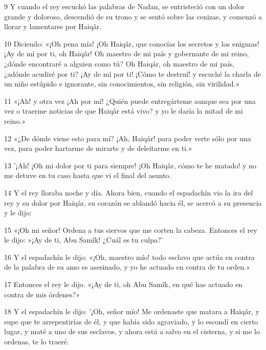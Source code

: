 \par 9 Y cuando el rey escuchó las palabras de Nadan, se entristeció con un dolor grande y doloroso, descendió de su trono y se sentó sobre las cenizas, y comenzó a llorar y lamentarse por Haiqâr.

\par 10 Diciendo: «¡Oh pena mía! ¡Oh Haiqâr, que conocías los secretos y los enigmas! ¡Ay de mí por ti, oh Haiqâr! Oh maestro de mi país y gobernante de mi reino, ¿dónde encontraré a alguien como tú? Oh Haiqâr, oh maestro de mi país, ¿adónde acudiré por ti? ¡Ay de mí por ti! ¡Cómo te destruí! y escuché la charla de un niño estúpido e ignorante, sin conocimientos, sin religión, sin virilidad.»

\par 11 «¡Ah! y otra vez ¡Ah por mí! ¿Quién puede entregárteme aunque sea por una vez o traerme noticias de que Haiqâr está vivo? y yo le daría la mitad de mi reino.»

\par 12 «¿De dónde viene esto para mí? ¡Ah, Haiqâr! para poder verte sólo por una vez, para poder hartarme de mirarte y de deleitarme en ti.»

\par 13 '¡Ah! ¡Oh mi dolor por ti para siempre! ¡Oh Haiqâr, cómo te he matado! y no me detuve en tu caso hasta que vi el final del asunto.

\par 14 Y el rey lloraba noche y día. Ahora bien, cuando el espadachín vio la ira del rey y su dolor por Haiqâr, su corazón se ablandó hacia él, se acercó a su presencia y le dijo:

\par 15 «¡Oh mi señor! Ordena a tus siervos que me corten la cabeza. Entonces el rey le dijo: »¡Ay de ti, Abu Samîk! ¿Cuál es tu culpa?'

\par 16 Y el espadachín le dijo: «¡Oh, maestro mío! todo esclavo que actúa en contra de la palabra de su amo es asesinado, y yo he actuado en contra de tu orden.»

\par 17 Entonces el rey le dijo. «¡Ay de ti, oh Abu Samîk, en qué has actuado en contra de mis órdenes?»

\par 18 Y el espadachín le dijo: '¡Oh, señor mío! Me ordenaste que matara a Haiqâr, y supe que te arrepentirías de él, y que había sido agraviado, y lo escondí en cierto lugar, y maté a uno de sus esclavos, y ahora está a salvo en el cisterna, y si me lo ordenas, te lo traeré.

